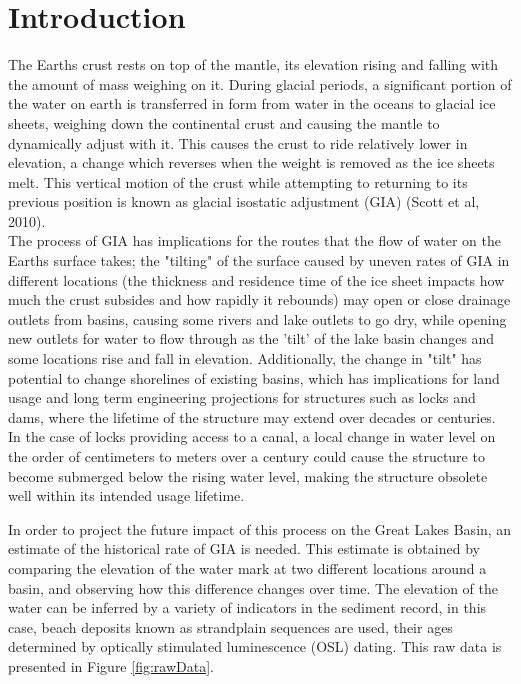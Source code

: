 \documentclass{article}
\begin{document}


\tableofcontents
\newpage


\newpage

\section{Introduction}

 The Earths crust rests on top of the mantle, its elevation rising and falling
 with the amount of mass weighing on it. During glacial periods, a significant portion
 of the water on earth is transferred in form from water in the oceans to glacial ice sheets,
 weighing down the continental crust and causing the mantle to dynamically adjust
 with it. This causes the crust to ride relatively lower in elevation,
 a change which reverses when the weight is removed as the ice sheets melt.
 This vertical motion of the crust while attempting to returning to its previous position is known
 as glacial isostatic adjustment (GIA) (Scott et al, 2010).\\
 
 The process of GIA has implications for the routes that the flow
 of water on the Earths surface takes; the "tilting" of the surface caused by 
 uneven rates of GIA in different locations (the thickness and residence time of
 the ice sheet impacts how much the crust subsides and how rapidly it rebounds) 
 may open or close drainage outlets from basins,
 causing some rivers and lake outlets to go dry, while opening new outlets for 
 water to flow through as the 'tilt' of the lake basin changes and some locations
 rise and fall in elevation.
 Additionally, the change in "tilt" has potential to change shorelines of existing
 basins,  which has implications for land usage and long term engineering
 projections for structures such as locks and dams, where the lifetime of
 the structure may extend over decades or centuries. In the case of locks providing
 access to a canal, a local change in water level on the order of centimeters to
 meters over a century could cause the structure to become submerged below the
 rising water level, making the structure obsolete well within its intended usage
 lifetime.\\

\newpage

 
 In order to project the future impact of this process on the Great Lakes Basin,
 an estimate of the historical rate of GIA is needed. This estimate is obtained by
 comparing the elevation of the water mark at two different locations around a basin, and
 observing how this difference changes over time. The elevation of the water can be inferred
 by a variety of indicators in the sediment record, in this case, beach deposits known
 as strandplain sequences are used, their ages determined by optically stimulated
 luminescence (OSL) dating. This raw data is presented in Figure \ref{fig:rawData}.\\

\end{document}
